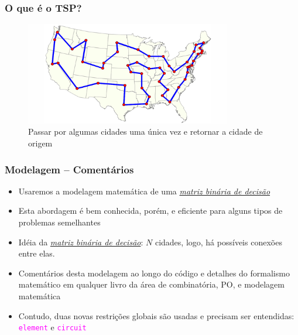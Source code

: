 \begin{frame}[fragile]

\frametitle{O que é o TSP?}

\begin{figure}[!htb]
\begin{center}
\includegraphics[width=0.80\textwidth, height=0.50\textheight]{figures/tsp01.jpg}
\caption{Passar por algumas cidades uma única vez e retornar a cidade de origem}
\end{center}
\end{figure}
    
\end{frame}



\begin{frame}[fragile] 

\frametitle{Modelagem -- Comentários}

\begin{itemize}
  \item Usaremos a modelagem matemática de uma \textit{\underline{matriz binária de decisão}}
  
  \pause
  \item Esta abordagem é bem conhecida, porém, e eficiente para alguns tipos de problemas semelhantes

  \pause
  \item Idéia da \textit{\underline{matriz binária de decisão}}: $N$ cidades, logo, há possíveis
  conexões entre elas. 
  
  \pause
  \item Comentários desta modelagem ao longo do código e detalhes do formalismo matemático
  em qualquer livro da área de combinatória, PO, e modelagem matemática

  \pause
  \item Contudo, duas novas restrições globais são usadas e precisam ser entendidas:    \textcolor{magenta}{\texttt{element}} e 
  \textcolor{magenta}{\texttt{circuit}}

\end{itemize}

\end{frame}


